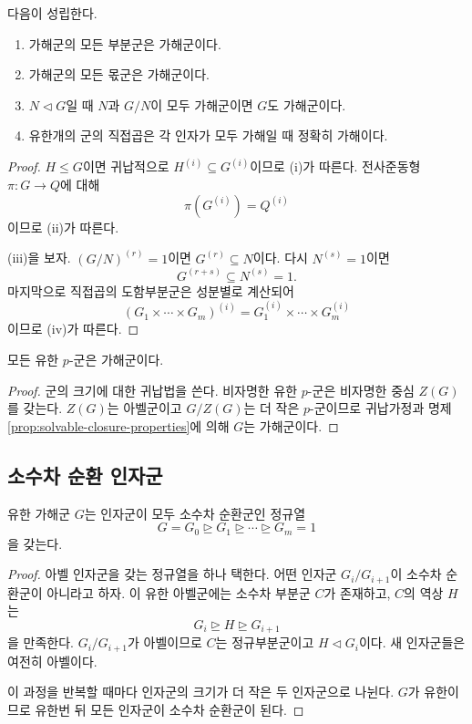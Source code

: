 \begin{proposition}
\label{prop:solvable-closure-properties}
다음이 성립한다.
\begin{enumerate}[label=(\roman*)]
  \item 가해군의 모든 부분군은 가해군이다.
  \item 가해군의 모든 몫군은 가해군이다.
  \item $N\triangleleft G$일 때 $N$과 $G/N$이 모두 가해군이면 $G$도 가해군이다.
  \item 유한개의 군의 직접곱은 각 인자가 모두 가해일 때 정확히 가해이다.
\end{enumerate}
\end{proposition}

\begin{proof}
$H\le G$이면 귀납적으로 $H^{(i)}\subseteq G^{(i)}$이므로 (i)가 따른다. 전사준동형 $\pi:G\to Q$에 대해
\[
  \pi(G^{(i)})=Q^{(i)}
\]
이므로 (ii)가 따른다.

(iii)을 보자. $(G/N)^{(r)}=1$이면 $G^{(r)}\subseteq N$이다. 다시 $N^{(s)}=1$이면
\[
  G^{(r+s)}\subseteq N^{(s)}=1.
\]
마지막으로 직접곱의 도함부분군은 성분별로 계산되어
\[
  (G_1\times\cdots\times G_m)^{(i)}
  =G_1^{(i)}\times\cdots\times G_m^{(i)}
\]
이므로 (iv)가 따른다.
\end{proof}

\begin{corollary}
모든 유한 $p$-군은 가해군이다.
\end{corollary}

\begin{proof}
군의 크기에 대한 귀납법을 쓴다. 비자명한 유한 $p$-군은 비자명한 중심 $Z(G)$를 갖는다. $Z(G)$는 아벨군이고 $G/Z(G)$는 더 작은 $p$-군이므로 귀납가정과 명제 \ref{prop:solvable-closure-properties}에 의해 $G$는 가해군이다.
\end{proof}

\subsection{소수차 순환 인자군}

\begin{theorem}[유한 가해군의 세분]
\label{thm:prime-cyclic-refinement}
유한 가해군 $G$는 인자군이 모두 소수차 순환군인 정규열
\[
  G=G_0\trianglerighteq G_1\trianglerighteq\cdots
  \trianglerighteq G_m=1
\]
을 갖는다.
\end{theorem}

\begin{proof}
아벨 인자군을 갖는 정규열을 하나 택한다. 어떤 인자군 $G_i/G_{i+1}$이 소수차 순환군이 아니라고 하자. 이 유한 아벨군에는 소수차 부분군 $C$가 존재하고, $C$의 역상 $H$는
\[
  G_i\trianglerighteq H\trianglerighteq G_{i+1}
\]
을 만족한다. $G_i/G_{i+1}$가 아벨이므로 $C$는 정규부분군이고 $H\triangleleft G_i$이다. 새 인자군들은 여전히 아벨이다.

이 과정을 반복할 때마다 인자군의 크기가 더 작은 두 인자군으로 나뉜다. $G$가 유한이므로 유한번 뒤 모든 인자군이 소수차 순환군이 된다.
\end{proof}


